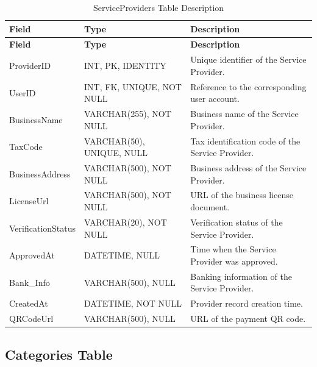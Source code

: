 \begin{longtable}{
		|>{\raggedright\arraybackslash}p{3.2cm}|
		>{\raggedright\arraybackslash}p{4.2cm}|
		>{\raggedright\arraybackslash}p{5.0cm}|
	}
	\caption{ServiceProviders Table Description}
	\label{tab:service-providers}\\
	\hline
	\textbf{Field} & \textbf{Type} & \textbf{Description} \\ \hline
	\endfirsthead
	\hline
	\textbf{Field} & \textbf{Type} & \textbf{Description} \\ \hline
	\endhead
	
	ProviderID & INT, PK, IDENTITY &
	Unique identifier of the Service Provider. \\ \hline
	
	UserID & INT, FK, UNIQUE, NOT NULL &
	Reference to the corresponding user account. \\ \hline
	
	BusinessName & VARCHAR(255), NOT NULL &
	Business name of the Service Provider. \\ \hline
	
	TaxCode & VARCHAR(50), UNIQUE, NULL &
	Tax identification code of the Service Provider. \\ \hline
	
	BusinessAddress & VARCHAR(500), NOT NULL &
	Business address of the Service Provider. \\ \hline
	
	LicenseUrl & VARCHAR(500), NOT NULL &
	URL of the business license document. \\ \hline
	
	VerificationStatus & VARCHAR(20), NOT NULL &
	Verification status of the Service Provider. \\ \hline
	
	ApprovedAt & DATETIME, NULL &
	Time when the Service Provider was approved. \\ \hline
	
	Bank\_Info & VARCHAR(500), NULL &
	Banking information of the Service Provider. \\ \hline
	
	CreatedAt & DATETIME, NOT NULL &
	Provider record creation time. \\ \hline
	
	QRCodeUrl & VARCHAR(500), NULL &
	URL of the payment QR code. \\ \hline
	
\end{longtable}


\subsection{Categories Table}

